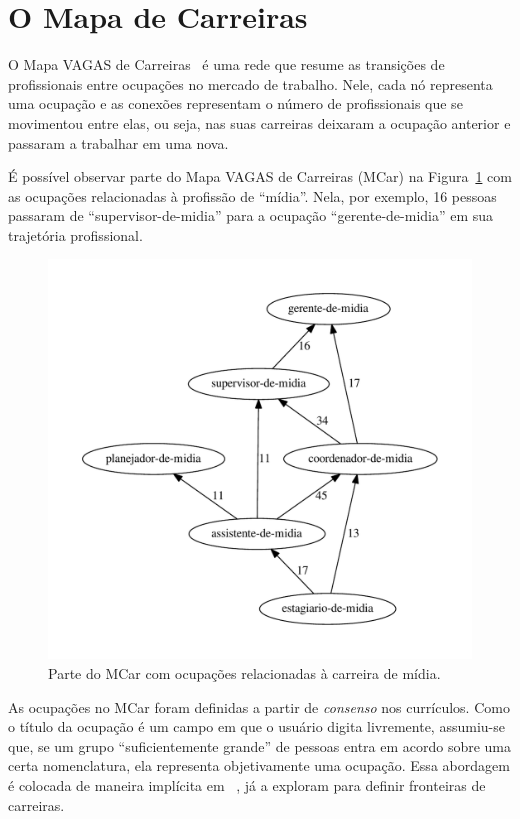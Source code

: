 \documentclass[
  article,
  11pt,
  a4paper,
  english,
  brazil,
  sumario=tradicional]{abntex2}
\begin{document}
\section{O Mapa de Carreiras} \label{sec:mapa}

O Mapa VAGAS de Carreiras~\cite{VAGAS_Tecnologia2015-yv} é uma rede que resume as transições de profissionais entre ocupações no mercado de trabalho. Nele, cada nó representa uma ocupação e as conexões representam o número de profissionais que se movimentou entre elas, ou seja, nas suas carreiras deixaram a ocupação anterior e passaram a trabalhar em uma nova.

É possível observar parte do Mapa VAGAS de Carreiras (MCar) na Figura~\ref{fig:ex-mapa-midia} com as ocupações relacionadas à profissão de \enquote{mídia}. Nela, por exemplo, 16 pessoas passaram de \enquote{supervisor-de-midia} para a ocupação \enquote{gerente-de-midia} em sua trajetória profissional.

\begin{figure}[ht]
  \centering
  \includegraphics[scale=0.6]{cluster_23.pdf}
  \caption{Parte do MCar com ocupações relacionadas à carreira de mídia.}
  \label{fig:ex-mapa-midia}
\end{figure}

As ocupações no MCar foram definidas a partir de \textit{consenso} nos currículos. Como o título da ocupação é um campo em que o usuário digita livremente, assumiu-se que, se um grupo \enquote{suficientemente grande} de pessoas entra em acordo sobre uma certa nomenclatura, ela representa objetivamente uma ocupação. Essa abordagem é colocada de maneira implícita em ~, já  a exploram para definir fronteiras de carreiras.
\end{document}
